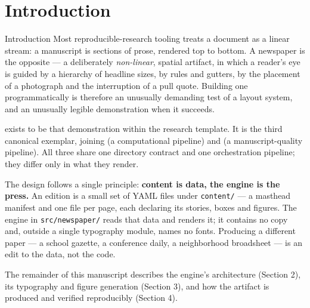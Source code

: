 \documentclass[
  ignorenonframetext,
]{beamer}
\author{\texorpdfstring{}{}}
\date{}
\begin{document}
\section{Introduction}\label{introduction}

\begin{frame}{Introduction}
Most reproducible-research tooling treats a document as a linear stream:
a manuscript is sections of prose, rendered top to bottom. A newspaper
is the opposite --- a deliberately \emph{non-linear}, spatial artifact,
in which a reader's eye is guided by a hierarchy of headline sizes, by
rules and gutters, by the placement of a photograph and the interruption
of a pull quote. Building one programmatically is therefore an unusually
demanding test of a layout system, and an unusually legible
demonstration when it succeeds.

 exists to be that demonstration within the
research template. It is the third canonical exemplar, joining
 (a computational pipeline) and
 (a manuscript-quality pipeline). All
three share one directory contract and one orchestration pipeline; they
differ only in what they render.

The design follows a single principle: \textbf{content is data, the
engine is the press.} An edition is a small set of YAML files under
\texttt{content/} --- a masthead manifest and one file per page, each
declaring its stories, boxes and figures. The engine in
\texttt{src/newspaper/} reads that data and renders it; it contains no
copy and, outside a single typography module, names no fonts. Producing
a different paper --- a school gazette, a conference daily, a
neighborhood broadsheet --- is an edit to the data, not the code.

The remainder of this manuscript describes the engine's architecture
(Section 2), its typography and figure generation (Section 3), and how
the artifact is produced and verified reproducibly (Section 4).
\end{frame}
\end{document}
